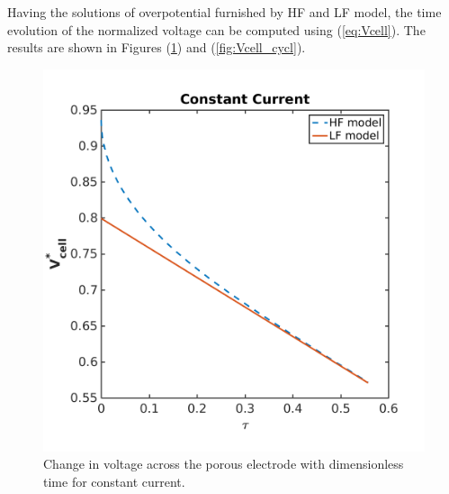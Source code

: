 \documentclass[]{article}
\begin{document}
Having the solutions of overpotential furnished by HF and LF model, the time evolution of the normalized voltage can be computed using (\ref{eq:Vcell}). The results are shown in Figures (\ref{fig:Vcell}) and (\ref{fig:Vcell_cycl}).

\begin{figure}[h]
    \centering
    \includegraphics[trim = 0in 0in 0in 0in, clip, width=1.1\textwidth]{figures/Vcell.png}      
    \caption{Change in voltage across the porous electrode with dimensionless time for constant current.}
    \label{fig:Vcell}
\end{figure}


\end{document}
